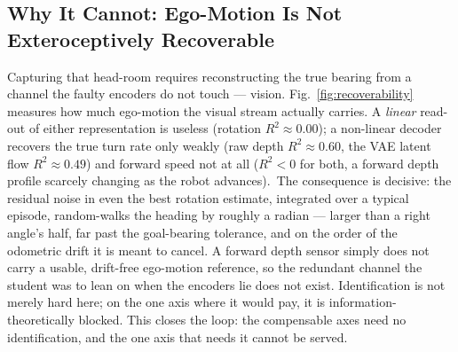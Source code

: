 \documentclass[journal]{IEEEtran}
\newcommand{\recovnumbers}{A \emph{linear} read-out of either representation is
useless (rotation $R^2 \approx 0.00$); a non-linear decoder recovers the true
turn rate only weakly (raw depth $R^2 \approx 0.60$, the VAE latent flow
$R^2 \approx 0.49$) and forward speed not at all ($R^2 < 0$ for both, a
forward depth profile scarcely changing as the robot advances).}
\begin{document}
\subsection{Why It Cannot: Ego-Motion Is Not Exteroceptively Recoverable}
\label{sec:recover}
Capturing that head-room requires reconstructing the true bearing from a
channel the faulty encoders do not touch --- vision. Fig.~\ref{fig:recoverability}
measures how much ego-motion the visual stream actually carries.
\recovnumbers\ The consequence is decisive: the residual noise in even the best
rotation estimate, integrated over a typical episode, random-walks the heading
by roughly a radian --- larger than a right angle's half, far past the
goal-bearing tolerance, and on the order of the odometric drift it is meant to
cancel. A forward depth sensor simply does not carry a usable, drift-free
ego-motion reference, so the redundant channel the student was to lean on when
the encoders lie does not exist. Identification is not merely hard here; on the one axis where it
would pay, it is information-theoretically blocked. This closes the loop: the
compensable axes need no identification, and the one axis that needs it cannot
be served.
\end{document}
